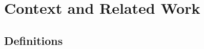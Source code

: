 \section{Context and Related Work}
\label{sec:secProcPrevious}

\subsection{Definitions}
\label{sec:renyiDefinition}




